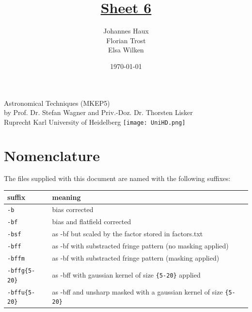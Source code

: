 \documentclass[11pt,a4paper,twoside]{article}
\title{\LARGE \underline {Sheet 6}}
\author{Johannes Haux \\ Florian Trost \\ Elsa Wilken}
\date{\today}
\begin{document}
\maketitle
\thispagestyle{empty}

\begin{center}
  Astronomical Techniques (MKEP5) \\
  \baselineskip35pt
  by Prof. Dr. Stefan Wagner and Priv.-Doz. Dr. Thorsten Lisker \\
  \baselineskip60pt
  Ruprecht Karl University of Heidelberg
\vskip 40pt
\texttt{[image: UniHD.png]}

\end{center}

\newpage
\setcounter{page}{1}		%

\section*{Nomenclature}
The files supplied with this document are named with the following suffixes:
\begin{table}[h!]
\begin{tabular}{ll}\toprule
suffix          & meaning \\ \midrule
\verb+-b+       & bias corrected \\
\verb+-bf+      & bias and flatfield corrected	\\
\verb+-bsf+     & as -bf but scaled by the factor stored in factors.txt	\\
\verb+-bff+     & as -bf with substracted fringe pattern (no masking applied)	\\
\verb+-bffm+    & as -bf with substracted fringe pattern (masking applied)	\\
\verb+-bffg{5-20}+    & as -bff with gaussian kernel of size \verb+{5-20}+ applied	\\
\verb+-bffu{5-20}+    & as -bff and unsharp masked with a gaussian kernel of size \verb+{5-20}+	\\
\bottomrule
\end{tabular}
\end{table}
\end{document}
